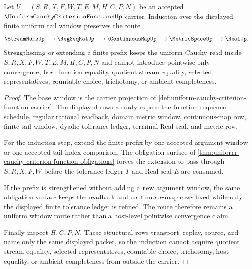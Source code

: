 \begin{theorem}
\label{thm:uniform-cauchy-criterion-function-finite-window-induction}
Let $U=(S,R,X,F,W,T,E,M,H,C,P,N)$ be an accepted $\UniformCauchyCriterionFunctionUp$ carrier. Induction over the displayed finite uniform tail window preserves the route
$$
\StreamNameUp \longrightarrow \RegSeqRatUp \longrightarrow \ContinuousMapUp \longrightarrow \MetricSpaceUp \longrightarrow \RealUp .
$$
Strengthening or extending a finite prefix keeps the uniform Cauchy read inside $S,R,X,F,W,T,E,M,H,C,P,N$ and cannot introduce pointwise-only convergence, host function equality, quotient stream equality, selected representatives, countable choice, trichotomy, or ambient completeness.
\end{theorem}
\begin{proof}
The base window is the carrier projection of \autoref{def:uniform-cauchy-criterion-function-carrier}. The displayed rows already expose the function-sequence schedule, regular rational readback, domain metric window, continuous-map row, finite tail window, dyadic tolerance ledger, terminal Real seal, and metric row.

For the induction step, extend the finite prefix by one accepted argument window or one accepted tail-index comparison. The obligation surface of \autoref{thm:uniform-cauchy-criterion-function-obligations} forces the extension to pass through $S,R,X,F,W$ before the tolerance ledger $T$ and Real seal $E$ are consumed.

If the prefix is strengthened without adding a new argument window, the same obligation surface keeps the readback and continuous-map rows fixed while only the displayed finite tolerance ledger is refined. The route therefore remains a uniform window route rather than a host-level pointwise convergence claim.

Finally inspect $H,C,P,N$. These structural rows transport, replay, source, and name only the same displayed packet, so the induction cannot acquire quotient stream equality, selected representatives, countable choice, trichotomy, host equality, or ambient completeness from outside the carrier.
\end{proof}


